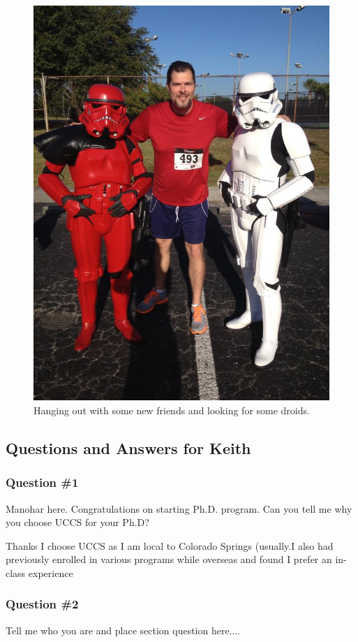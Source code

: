 \begin{figure}
	\centering
	\caption{Hanging out with some new friends and looking for some droids.}
	\label{fig:PaulsonLittleTall}
	\includegraphics[width=0.7\linewidth]{PaulsonLittleTall}
\end{figure}

    \subsection{Questions and Answers for Keith}
    \subsubsection {Question \#1}
		Manohar here. Congratulations on starting Ph.D. program. Can you tell me why you choose UCCS for your Ph.D?
		
		Thanks I choose UCCS as I am local to Colorado Springs (usually.I also had previously enrolled in various programs while overseas and found I prefer an in-class experience 

    \subsubsection {Question \#2}

	  Tell me who you are and place section question here....